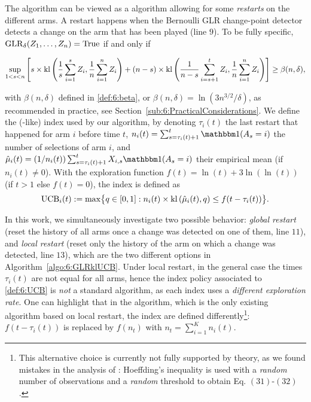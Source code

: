The \GLRklUCB{} algorithm can be viewed as a \klUCB{} algorithm allowing for some \emph{restarts} on the different arms. A restart happens when the Bernoulli GLR change-point detector detects a change on the arm that has been played (line $9$).
%
To be fully specific, $\mathrm{GLR}_\delta(Z_1,\dots,Z_n) = \mathrm{True}$ if and only if
\begin{small}
    \[\sup_{1 < s < n} \left[s \times \mathrm{kl} \left(\frac{1}{s}\sum_{i=1}^s Z_i , \frac{1}{n}\sum_{i=1}^n Z_i\right) + (n-s) \times \mathrm{kl} \left(\frac{1}{n-s}\sum_{i=s+1}^t Z_i , \frac{1}{n}\sum_{i=1}^n Z_i\right)\right] \geq \beta(n,\delta),\]
\end{small}%
%
with $\beta(n,\delta)$ defined in \eqref{def:6:beta}, or $\beta(n,\delta) = \ln(3n^{3/2}/\delta)$, as recommended in practice, see Section~\ref{sub:6:PracticalConsiderations}. We define the (\klUCB{}-like) index used by our algorithm, by denoting
$\tau_i(t)$ the last restart that happened for arm $i$ before time $t$, $n_i(t) = \sum_{s=\tau_i(t)+1}^{t} \indic(A_s=i)$ the number of selections of arm $i$,
and $\hat{\mu}_i(t) = (1/n_i(t)) \sum_{s=\tau_i(t)+1}^{t}X_{i,s} \indic(A_s=i)$ their empirical mean (if $n_i(t)\neq0$).
%
With the exploration function $f(t) = \ln(t) + 3 \ln(\ln(t))$ (if $t>1$ else $f(t)=0$),
the index is defined as
\begin{equation}\label{def:6:UCB}
    \mathrm{UCB}_i(t) := \max \bigl\{ q\in[0,1] : n_i(t) \times \mathrm{kl}\left(\hat{\mu}_i(t),q\right) \leq f(t - \tau_i(t)) \bigr\}.
\end{equation}

In this work, we simultaneously investigate two possible behavior: \emph{global restart} (reset the history of all arms once a change was detected on one of them, line $11$), and \emph{local restart} (reset only the history of the arm on which a change was detected, line $13$), which are the two different options in Algorithm~\ref{algo:6:GLRklUCB}.
%
Under local restart, in the general case the times $\tau_i(t)$ are not equal for all arms, hence the index policy associated to \eqref{def:6:UCB} is \emph{not} a standard \UCB{} algorithm, as each index uses a \emph{different exploration rate}.
%
One can highlight that in the \CUSUMUCB{} algorithm, which is the only existing algorithm based on local restart, the \UCB{} index are defined differently\footnote{This alternative choice is currently not fully supported by theory, as we found mistakes in the analysis of \CUSUMUCB{}: Hoeffding's inequality is used with a \emph{random} number of observations and a \emph{random} threshold to obtain Eq. $(31)$-$(32)$.}:
$f(t-\tau_i(t))$ is replaced by $f(n_t)$ with $n_t = \sum_{i=1}^K n_i(t)$.


